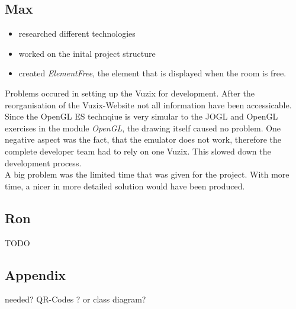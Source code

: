 \documentclass[]{article}
\begin{document}
\begin{multicols}{2}
\subsection{Max}
\begin{itemize}
\item researched different technologies
\item worked on the inital project structure
\item created \emph{ElementFree}, the element that is displayed when the room is free.
\end{itemize}
 Problems occured in setting up the Vuzix for development. After the reorganisation of the Vuzix-Website not all information have been accessicable. \\
 Since the OpenGL ES technqiue is very simular to the JOGL and OpenGL exercises in the module \emph{OpenGL}, the drawing itself caused no problem. One negative aspect was the fact, that the emulator does not work, therefore the complete developer team had to rely on one Vuzix. This slowed down the development process.\\
 A big problem was the limited time that was given for the project.  With more time, a nicer in more detailed solution would have been produced.
\subsection{Ron}
TODO
\end{multicols}
\subsection{Appendix}
needed? QR-Codes ? or class diagram?
\end{document}
